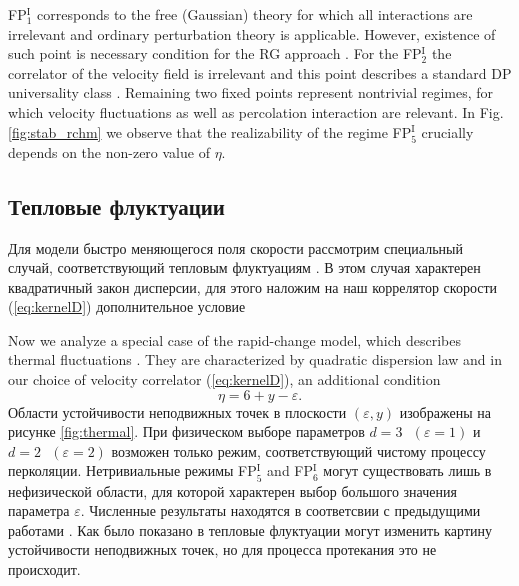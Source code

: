 \documentclass[12pt]{article}
\def\eps{\varepsilon}
\newcommand{\fp}[2]{FP$^{\textrm{#1}}_{#2}$}
\begin{document}
\fp{I}{1} corresponds to the free (Gaussian) theory for which all interactions are irrelevant 
and ordinary perturbation theory is applicable. However, existence of such point is necessary
condition for the RG approach \cite{Vasiliev}.
For the \fp{I}{2} the correlator of the velocity field is irrelevant and 
this point describes a standard DP universality class \cite{JanTau04}.
Remaining two fixed points represent nontrivial regimes, for which velocity
fluctuations as well as percolation interaction are relevant.
 In Fig. \ref{fig:stab_rchm} we observe that the realizability of the regime \fp{I}{5} 
crucially depends on the non-zero value of $\eta$.
{\subsection{Тепловые флуктуации} \label{subsec:thermal}}
Для модели быстро меняющегося поля скорости рассмотрим специальный случай, соответствующий тепловым флуктуациям \cite{FNS}.
В этом случая характерен квадратичный закон дисперсии, для этого наложим на наш коррелятор скорости (\ref{eq:kernelD}) дополнительное условие 

Now we analyze a special case of the rapid-change model, which describes
thermal fluctuations \cite{FNS}. They
are characterized by quadratic dispersion law and in our choice of
velocity correlator (\ref{eq:kernelD}), an additional condition 
\begin{equation}
  \eta = 6 +y - \eps.
  \label{eq:cond_thermal}
\end{equation}
Области устойчивости неподвижных точек в плоскости $(\eps,y)$ изображены на рисунке \ref{fig:thermal}.
При физическом выборе параметров $d=3\mbox{ }(\eps=1)$ и $d=2\mbox{ }(\eps=2)$ возможен только режим, соответствующий чистому процессу перколяции.
Нетривиальные режимы \fp{I}{5} and \fp{I}{6} могут существовать лишь в нефизической области, для которой характерен выбор большого значения параметра $\eps$.
Численные результаты находятся в соответсвии с предыдущими работами \cite{AntKap08,AntKap10}.
Как было показано в \cite{HH00} тепловые флуктуации могут изменить картину устойчивости неподвижных точек, но для процесса протекания это не происходит.
\end{document}
